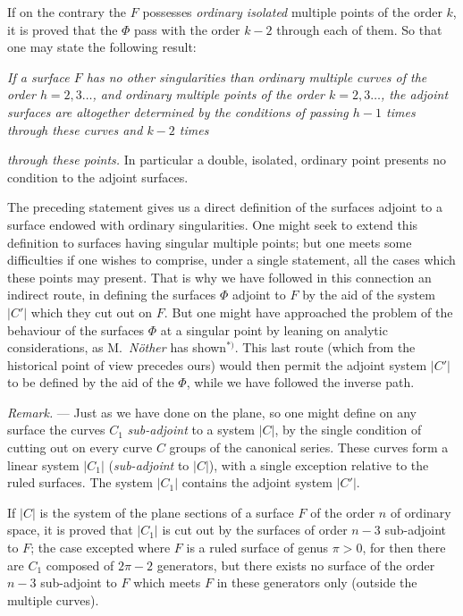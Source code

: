 \documentclass{article}
\begin{document}
If on the contrary the $F$ possesses \emph{ordinary isolated} multiple points of the order $k$, it is proved that the $\Phi$ pass with the order $k - 2$ through each of them. So that one may state the following result:

\emph{If a surface $F$ has no other singularities than ordinary multiple curves of the order $h = 2, 3 \ldots$, and ordinary multiple points of the order $k = 2, 3 \ldots$, the adjoint surfaces are altogether determined by the conditions of passing $h - 1$ times through these curves and $k - 2$ times}

\emph{through these points.} In particular a double, isolated, ordinary point presents no condition to the adjoint surfaces.

The preceding statement gives us a direct definition of the surfaces adjoint to a surface endowed with ordinary singularities. One might seek to extend this definition to surfaces having singular multiple points; but one meets some difficulties if one wishes to comprise, under a single statement, all the cases which these points may present. That is why we have followed in this connection an indirect route, in defining the surfaces $\Phi$ adjoint to $F$ by the aid of the system $|C'|$ which they cut out on $F$. But one might have approached the problem of the behaviour of the surfaces $\Phi$ at a singular point by leaning on analytic considerations, as M.\ \emph{Nöther} has shown${}^{*)}$. This last route (which from the historical point of view precedes ours) would then permit the adjoint system $|C'|$ to be defined by the aid of the $\Phi$, while we have followed the inverse path.

\emph{Remark.} --- Just as we have done on the plane, so one might define on any surface the curves $C_{1}$ \emph{sub-adjoint} to a system $|C|$, by the single condition of cutting out on every curve $C$ groups of the canonical series. These curves form a linear system $|C_{1}|$ (\emph{sub-adjoint} to $|C|$), with a single exception relative to the ruled surfaces. The system $|C_{1}|$ contains the adjoint system $|C'|$.

If $|C|$ is the system of the plane sections of a surface $F$ of the order $n$ of ordinary space, it is proved that $|C_{1}|$ is cut out by the surfaces of order $n-3$ sub-adjoint to $F$; the case excepted where $F$ is a ruled surface of genus $\pi > 0$, for then there are $C_{1}$ composed of $2\pi-2$ generators, but there exists no surface of the order $n-3$ sub-adjoint to $F$ which meets $F$ in these generators only (outside the multiple curves).
\end{document}
